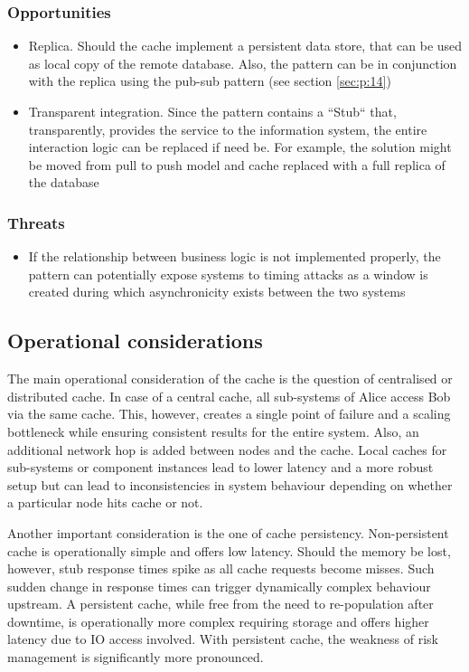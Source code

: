 \documentclass[10pt,a4paper]{article}
\begin{document}
\subsubsection{Opportunities}	
	 	\begin{itemize}
			\item Replica. Should the cache implement a persistent data store, that can be used as local copy of the remote database. Also, the pattern can be in conjunction with the replica using the pub-sub pattern (see section \ref{sec:p:14})
			\item Transparent integration. Since the pattern contains a ``Stub`` that, transparently, provides the service to the information system, the entire interaction logic can be replaced if need be. For example, the solution might be moved from pull to push model and cache replaced with a full replica of the database
		\end{itemize}
		
\subsubsection{Threats}	
	 	\begin{itemize}
			\item If the relationship between business logic is not implemented properly, the pattern can potentially expose systems to timing attacks as a window is created during which asynchronicity exists between the two systems
		\end{itemize}

\subsection{Operational considerations}
The main operational consideration of the cache is the question of centralised or distributed cache. In case of a central cache, all sub-systems of Alice access Bob via the same cache. This, however, creates a single point of failure and a scaling bottleneck while ensuring consistent results for the entire system. Also, an additional network hop is added between nodes and the cache. Local caches for sub-systems or component instances lead to lower latency and a more robust setup but can lead to inconsistencies in system behaviour depending on whether a particular node hits cache or not. 

Another important consideration is the one of cache persistency. Non-persistent cache is operationally simple and offers low latency. Should the memory be lost, however, stub response times spike as all cache requests become misses. Such sudden change in response times can trigger dynamically complex behaviour upstream. A persistent cache, while free from the need to re-population after downtime, is operationally more complex requiring storage and offers higher latency due to IO access involved. With persistent cache, the weakness of risk management is significantly more pronounced.
\end{document}
